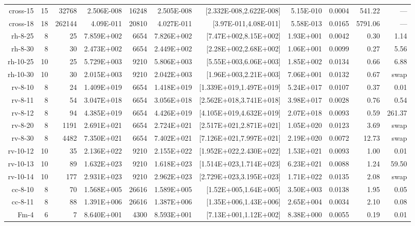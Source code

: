 \documentclass[11pt,a4paper]{article}
\begin{document}
\begin{table}[t!]
\begin{tabular*}{\linewidth}{@{\extracolsep{\fill}}r@{\quad}r@{\quad}r@{\quad}r
@{\quad}r@{\quad}r@{\quad}r@{\quad}r@{~}r@{\quad}r@{\quad}r}
cross-15 & 15 & 32768 & 2.506E-008	& 16248	& 2.505E-008 & [2.332E-008,2.622E-008] & 5.15E-010 & 0.0004 & 541.22 & ---\\
cross-18 & 18 & 262144 & 4.09E-011 & 20810 & 4.027E-011	&[3.97E-011,4.08E-011] & 5.58E-013	& 0.0165 & 5791.06 &  ---\\
rh-8-25 & 8 & 25 & 7.859E+002 & 6654 & 7.826E+002 & [7.47E+002,8.15E+002] & 1.93E+001 & 0.0042 & 0.30 & 1.14\\
rh-8-30 & 8 & 30 & 2.473E+002 & 6654 & 2.449E+002 & [2.28E+002,2.68E+002] & 1.06E+001 & 0.0099 & 0.27 & 5.56\\
rh-10-25 & 10 & 25 & 5.729E+003 & 9210 & 5.806E+003 & [5.55E+003,6.06E+003] & 1.85E+002 & 0.0134 & 0.66 & 6.88\\
rh-10-30 & 10 & 30 & 2.015E+003 & 9210 & 2.042E+003 & [1.96E+003,2.21E+003] & 7.06E+001 & 0.0132 & 0.67 & swap\\
rv-8-10 & 8 & 24 & 1.409E+019 & 6654 & 1.418E+019 & [1.339E+019,1.497E+019] & 5.24E+017 & 0.0107 & 0.37 & 0.01\\
rv-8-11 & 8 & 54 & 3.047E+018 & 6654 & 3.056E+018 & [2.562E+018,3.741E+018] & 3.98E+017 & 0.0028 & 0.76 & 0.54\\
rv-8-12 & 8 & 94 & 4.385E+019 & 6654 & 4.426E+019 & [4.105E+019,4.632E+019] & 2.07E+018 & 0.0093 & 0.59 & 261.37\\
rv-8-20 & 8 & 1191 & 2.691E+021 & 6654 & 2.724E+021 & [2.517E+021,2.871E+021] & 1.05E+020 & 0.0123 & 3.69 & swap\\
rv-8-30 & 8 & 4482 & 7.350E+021 & 6654 & 7.402E+021 & [7.126E+021,7.997E+021] & 2.19E+020 & 0.0072 & 12.73 & swap\\
rv-10-12 & 10 & 35 & 2.136E+022 & 9210 & 2.155E+022 & [1.952E+022,2.430E+022] & 1.53E+021 & 0.0093 & 1.00 & 0.01\\
rv-10-13 & 10 & 89 & 1.632E+023 & 9210 & 1.618E+023 & [1.514E+023,1.714E+023] & 6.23E+021 & 0.0088 & 1.24 & 59.50\\
rv-10-14 & 10 & 177 & 2.931E+023 & 9210 & 2.962E+023 & [2.729E+023,3.195E+023] & 1.71E+022 & 0.0135 & 2.08 & swap\\
cc-8-10 & 8 & 70 & 1.568E+005 & 26616 & 1.589E+005 & [1.52E+005,1.64E+005] & 3.50E+003 & 0.0138 & 1.95 & 0.05\\
cc-8-11 & 8 & 88 & 1.391E+006 & 26616 & 1.387E+006 & [1.35E+006,1.43E+006] & 2.65E+004 & 0.0034 & 2.10 & 0.08\\
Fm-4 & 6 & 7 & 8.640E+001 & 4300 & 8.593E+001 & [7.13E+001,1.12E+002] & 8.38E+000 & 0.0055 & 0.19 & 0.01\\

\end{tabular*}
\end{table}
\end{document}

